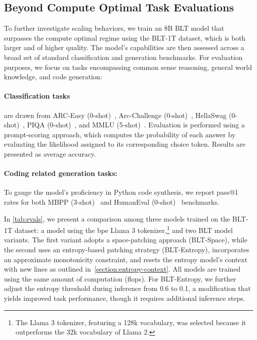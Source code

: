 \subsection{Beyond Compute Optimal Task Evaluations}
\label{section:evals}
To further investigate scaling behaviors, we train an 8B {\textsc BLT} model that surpasses the compute optimal regime using the {\textsc BLT}-1T dataset, which is both larger and of higher quality. The model's capabilities are then assessed across a broad set of standard classification and generation benchmarks. For evaluation purposes, we focus on tasks encompassing common sense reasoning, general world knowledge, and code generation:
\paragraph{Classification tasks} are drawn from ARC-Easy (0-shot)~\citep{Eval_ARC}, Arc-Challenge (0-shot)~\citep{Eval_ARC}, HellaSwag (0-shot)~\citep{Eval_hellaswag}, PIQA (0-shot)~\citep{Eval_piqa}, and MMLU (5-shot)~\citep{hendrycks2020measuring}.  Evaluation is performed using a prompt-scoring approach, which computes the probability of each answer by evaluating the likelihood assigned to its corresponding choice token. Results are presented as average accuracy.
\paragraph{Coding related generation tasks:}  To gauge the model’s proficiency in Python code synthesis, we report pass@1 rates for both MBPP (3-shot)~\citep{Eval_MBPP} and HumanEval (0-shot)~\citep{Eval_HumanEval} benchmarks.

In \autoref{tab:evals}, we present a comparison among three models trained on the {\textsc BLT}-1T dataset: a model using the bpe Llama 3 tokenizer,\footnote{The Llama 3 tokenizer, featuring a 128k vocabulary, was selected because it outperforms the 32k vocabulary of Llama 2.} and two {\textsc BLT} model variants. The first variant adopts a space-patching approach ({\textsc BLT}-Space), while the second uses an entropy-based patching strategy ({\textsc BLT}-Entropy), incorporates an approximate monotonicity constraint, and resets the entropy model's context with new lines as outlined in~\autoref{section:entropy-context}. All models are trained using the same amount of computation (flops). For {\textsc BLT}-Entropy, we further adjust the entropy threshold during inference from 0.6 to 0.1, a modification that yields improved task performance, though it requires additional inference steps.


